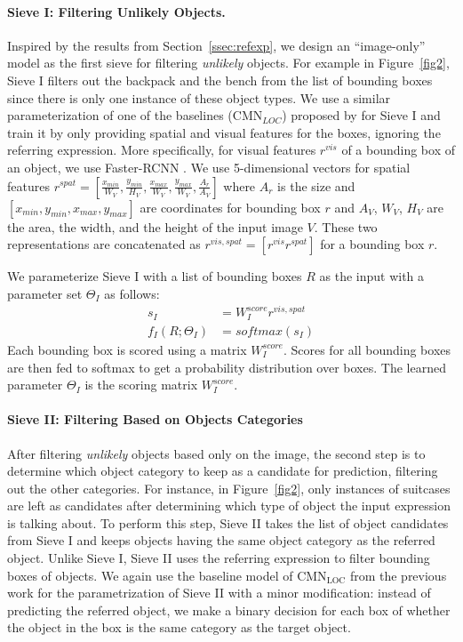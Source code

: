 \documentclass[11pt,a4paper]{article}
\begin{document}
\paragraph{Sieve I: Filtering Unlikely Objects.}\label{sec:s1} 
Inspired by the results from Section~\ref{ssec:refexp}, we design an ``image-only'' model 
as the first sieve for filtering \textit{unlikely} objects.
For example in Figure~\ref{fig2}, Sieve I filters out the backpack and the bench from the list of bounding boxes since there is only one instance of these object types.
We use a similar parameterization of one of the baselines ($\text{CMN}_{LOC}$) proposed by \citet{hu2017modeling} for Sieve I and train it by only providing spatial and visual features for the boxes, ignoring the referring expression. More specifically, for visual features $r^{vis}$ of a bounding box of an object, we use Faster-RCNN \citep{ren2015faster}.
We use 5-dimensional vectors for spatial features $r^{spat} = [\frac{x_{min}}{W_V}, \frac{y_{min}}{H_V}, \frac{x_{max}}{W_V}, \frac{y_{max}}{W_V}, \frac{A_r}{A_V}  ]$ where $A_r$ is the size and $[x_{min}, y_{min}, x_{max}, y_{max}]$ are coordinates for bounding box $r$ and $A_V$, $W_V$, $H_V$ are the area, the width, and the height of the input image $V$.
These two representations are concatenated as $r^{vis,spat} = [r^{vis} r^{spat}]$ for a bounding box $r$.

We parameterize Sieve I with a list of bounding boxes $R$ as the input with a parameter set $\Theta_I$ as follows:
\vspace{-10pt}
\begin{align}
	s_{I} & = W_{I}^{score} r^{vis,spat} \label{eq-s1-1} \\ 
    f_{I}(R; \Theta_{I}) & = softmax(s_{I}) \label{eq-s1-2}
\end{align}
Each bounding box is scored using a matrix $W^{score}_{I}$.
Scores for all bounding boxes are then fed to softmax to get a probability distribution over boxes.
The learned parameter $\Theta_{I}$ is the scoring  matrix $W_I^{score}$.
\paragraph{Sieve II: Filtering Based on Objects Categories}\label{sec:s2} After filtering \textit{unlikely} objects based only on the image, the second step is to determine which object category to keep as a candidate for prediction, filtering out the other categories.
For instance, in Figure~\ref{fig2}, only instances of suitcases are left as candidates after determining which type of object the input expression is talking about.
To perform this step, Sieve II takes the list of object candidates from  Sieve I and keeps objects having the same object category as the referred object.
Unlike Sieve I, Sieve II uses the referring expression to filter bounding boxes of objects.
We again use the baseline model of $\text{CMN}_{\text{LOC}}$ from the previous work \citep{hu2017modeling} for the parametrization of Sieve II with a minor modification: instead of predicting the referred object, we make a binary decision for each box of whether the object in the box is the same category as the target object.
\end{document}
